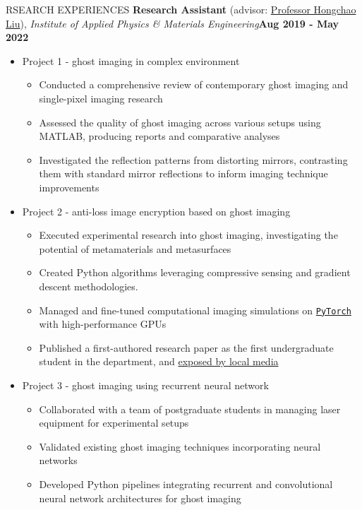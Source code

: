 \documentclass[10pt]{article} %
\begin{document}
\begin{section}{RSEARCH EXPERIENCES}
\textbf{Research Assistant} (advisor: \href{mailto:hcliu@um.edu.mo}{Professor Hongchao Liu}), \textit{Institute of Applied Physics \& Materials Engineering}\hfill \textbf{Aug 2019 - May 2022} 
\begin{itemize}[leftmargin=1.5em]
    \item Project 1 - ghost imaging in complex environment %
    \begin{itemize}[leftmargin=1.5em]
        \item Conducted a comprehensive review of contemporary ghost imaging and single-pixel imaging research
        \item Assessed the quality of ghost imaging across various setups using MATLAB, producing reports and comparative analyses
        \item Investigated the reflection patterns from distorting mirrors, contrasting them with standard mirror reflections to inform imaging technique improvements
    \end{itemize}
    \item Project 2 - anti-loss image encryption based on ghost imaging %
    \begin{itemize}[leftmargin=1.5em]
        \item Executed experimental research into ghost imaging, investigating the potential of metamaterials and metasurfaces
        \item Created Python algorithms leveraging compressive sensing and gradient descent methodologies.
        \item Managed and fine-tuned computational imaging simulations on \href{https://pytorch.org/}{\texttt{PyTorch}} with high-performance GPUs
        \item Published a first-authored research paper as the first undergraduate student in the department, and \href{https://www.tdm.com.mo/en/news-detail/683438?isvideo=false&lang=en&category=all}{exposed by local media} 
    \end{itemize}
    \item Project 3 - ghost imaging using recurrent neural network %
    \begin{itemize}[leftmargin=1.5em]
        \item Collaborated with a team of postgraduate students in managing laser equipment for experimental setups
        \item Validated existing ghost imaging techniques incorporating neural networks
        \item Developed Python pipelines integrating recurrent and convolutional neural network architectures for ghost imaging
    \end{itemize}
\end{itemize}

\end{section}
\end{document}
